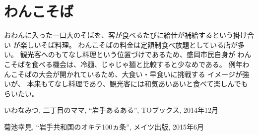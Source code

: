 \documentclass[autodetect-engine,dvi=dvipdfmx,ja=standard,twocolumn,jbase=14.1Q]{bxjsarticle} %
\begin{document}
\section{わんこそば}
おわんに入った一口大のそばを、客が食べるたびに給仕が補給するという掛け合い
が楽しいそば料理。
わんこそばの料金は定額制食べ放題としている店が多い。
観光客へのもてなし料理という位置づけであるため、盛岡市民自身が
わんこそばを食べる機会は、冷麺、じゃじゃ麺と比較すると少なめである。
例年わんこそばの大会が開かれているため、大食い・早食いに挑戦する
イメージが強いが、
本来もてなし料理であり、観光客には和気あいあいと食べて楽しんでもらいたい。



\begin{thebibliography}{9}%

いわなみつ, 二丁目のママ, ``岩手あるある'', TOブックス, 2014年12月

菊池幸見, ``岩手共和国のオキテ100ヵ条'', メイツ出版, 2015年6月
\end{thebibliography}
\end{document}
